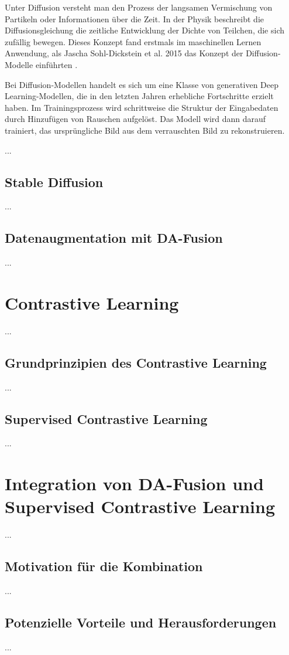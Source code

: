 Unter Diffusion versteht man den Prozess der langsamen Vermischung von Partikeln oder Informationen über die Zeit. In der Physik beschreibt die Diffusionsgleichung die zeitliche Entwicklung der Dichte von Teilchen, die sich zufällig bewegen. Dieses Konzept fand erstmals im maschinellen Lernen Anwendung, als Jascha Sohl-Dickstein et al. 2015 das Konzept der Diffusion-Modelle einführten \parencite{}.

Bei Diffusion-Modellen handelt es sich um eine Klasse von generativen Deep Learning-Modellen, die in den letzten Jahren erhebliche Fortschritte erzielt haben. Im Trainingsprozess wird schrittweise die Struktur der Eingabedaten durch Hinzufügen von Rauschen aufgelöst. Das Modell wird dann darauf trainiert, das ursprüngliche Bild aus dem verrauschten Bild zu rekonstruieren.

...


\subsection{Stable Diffusion}

...

\subsection{Datenaugmentation mit DA-Fusion}

...

\section{Contrastive Learning}

...

\subsection{Grundprinzipien des Contrastive Learning}

...

\subsection{Supervised Contrastive Learning}

...

\section{Integration von DA-Fusion und Supervised Contrastive Learning}

...

\subsection{Motivation für die Kombination}

...

\subsection{Potenzielle Vorteile und Herausforderungen}

...